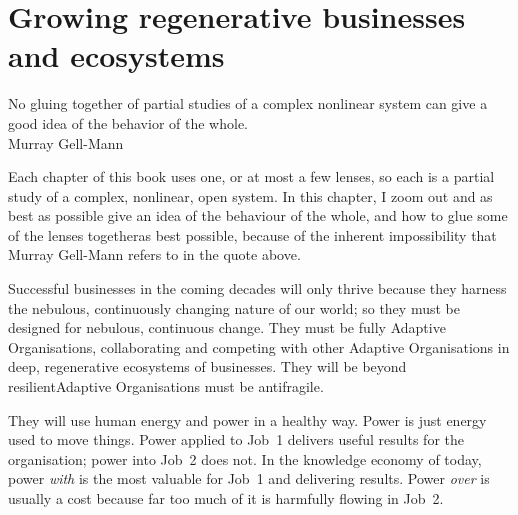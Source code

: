 ﻿\chapter{Growing regenerative businesses and ecosystems}
\label{chapter:growing-regenerative-organisations}




\begin{chapterquotation}
No gluing together of partial studies of a complex nonlinear system can give a good idea of the behavior of the whole. \\
\raggedleft\textemdash Murray Gell-Mann
\end{chapterquotation} 


Each chapter of this book uses one, or at most a few lenses, so each is a partial study of a complex, nonlinear, open system. In this chapter, I zoom out and as best as possible give an idea of the behaviour of the whole, and how to glue some of the lenses together\textemdash as best possible, because of the inherent impossibility that Murray Gell-Mann refers to in the quote above. 


Successful businesses in the coming decades will only thrive because they harness the nebulous, continuously changing nature of our world; so they must be designed for nebulous, continuous change. They must be fully Adaptive Organisations, collaborating and competing with other Adaptive Organisations in deep, regenerative ecosystems of businesses. They will be beyond resilient\textemdash Adaptive Organisations must be antifragile\cite{taleb-antifragile}.


They will use human energy and power in a healthy way. Power is just energy used to move things. Power applied to Job~1 delivers useful results for the organisation; power into Job~2 does not. In the knowledge economy of today, power \emph{with} is the most valuable for Job~1 and delivering results. Power \emph{over} is usually a cost because far too much of it is harmfully flowing in Job~2. 


